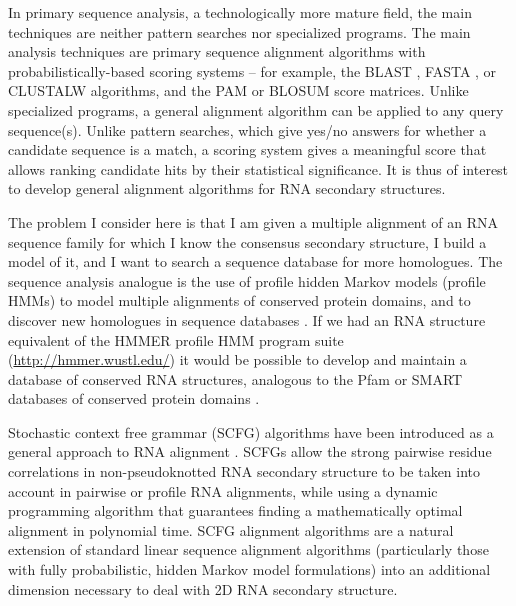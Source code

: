 \documentclass[11pt]{article}
\begin{document}
In primary sequence analysis, a technologically more mature field, the
main techniques are neither pattern searches nor specialized
programs. The main analysis techniques are primary sequence alignment
algorithms with probabilistically-based scoring systems -- for
example, the BLAST \cite{Altschul97}, FASTA \cite{Pearson88}, or
CLUSTALW \cite{Thompson94b} algorithms, and the PAM \cite{Dayhoff78}
or BLOSUM \cite{Henikoff92} score matrices. Unlike specialized
programs, a general alignment algorithm can be applied to any query
sequence(s). Unlike pattern searches, which give yes/no answers for
whether a candidate sequence is a match, a scoring system gives a
meaningful score that allows ranking candidate hits by their
statistical significance. It is thus of interest to develop general
alignment algorithms for RNA secondary structures.

The problem I consider here is that I am given a multiple alignment of
an RNA sequence family for which I know the consensus secondary
structure, I build a model of it, and I want to search a sequence
database for more homologues. The sequence analysis analogue is the
use of profile hidden Markov models (profile HMMs) to model multiple
alignments of conserved protein domains, and to discover new
homologues in sequence databases \cite{Krogh94,Eddy98}. If we had an
RNA structure equivalent of the HMMER profile HMM program suite
(\url{http://hmmer.wustl.edu/}) it would be possible to develop and
maintain a database of conserved RNA structures, analogous to the Pfam
or SMART databases of conserved protein domains
\cite{Bateman02,LetunikBork02}.

Stochastic context free grammar (SCFG) algorithms have been introduced
as a general approach to RNA alignment
\cite{Eddy94,Sakakibara94c,Durbin98}. SCFGs allow the strong pairwise
residue correlations in non-pseudoknotted RNA secondary structure to
be taken into account in pairwise or profile RNA alignments, while
using a dynamic programming algorithm that guarantees finding a
mathematically optimal alignment in polynomial time. SCFG alignment
algorithms are a natural extension of standard linear sequence
alignment algorithms (particularly those with fully probabilistic,
hidden Markov model formulations) into an additional dimension
necessary to deal with 2D RNA secondary structure.
\end{document}
